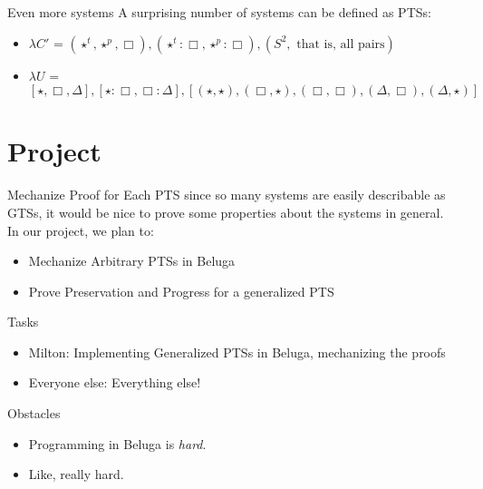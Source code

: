 \documentclass{beamer}
\begin{document}
\begin{frame}{Even more systems}
    A surprising number of systems can be defined as PTSs:
    \begin{itemize}
        \item<1-> $\lambda C'$ = $(\star^t, \star^p, \Box), (\star^t : \Box, \star^p : \Box), (S^2, \text{ that is, all pairs})$
        \item<2-> $\lambda U$ = $[\star, \Box, \Delta], [\star : \Box, \Box : \Delta], [(\star, \star), (\Box, \star), (\Box, \Box), (\Delta, \Box), (\Delta, \star)]$
    \end{itemize}
\end{frame}

\section{Project}

\begin{frame}{Mechanize Proof for Each PTS}
    since so many systems are easily describable as GTSs, it would be nice to prove some properties about the systems in general. \\
    In our project, we plan to: 
    \begin{itemize}
        \item<1-> Mechanize Arbitrary PTSs in Beluga
        \item<2-> Prove Preservation and Progress for a generalized PTS
    \end{itemize}
\end{frame}

\begin{frame}{Tasks}
    \begin{itemize}
        \item<1-> Milton: Implementing Generalized PTSs in Beluga, mechanizing the proofs
        \item<2-> Everyone else: Everything else!
    \end{itemize}
\end{frame}

\begin{frame}{Obstacles}
    \begin{itemize}
        \item<1-> Programming in Beluga is \textit{hard}. 
        \item<2-> Like, really hard. 
    \end{itemize}
\end{frame}
\end{document}
